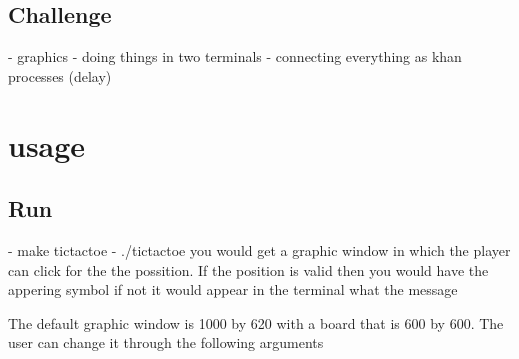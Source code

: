 \documentclass{article}
\begin{document}
\subsection*{Challenge}
- graphics
- doing things in two terminals
- connecting everything as khan processes (delay)
\section*{usage}
\subsection*{Run}
- make tictactoe
- ./tictactoe
you would get a graphic window in which the player can click for the  the possition. If the position is valid then you would have the appering symbol if not it would appear in  the terminal what the message

The default graphic window is 1000 by 620 with a board that is 600 by  600. The user can change it through the following arguments 
  
\end{document}
